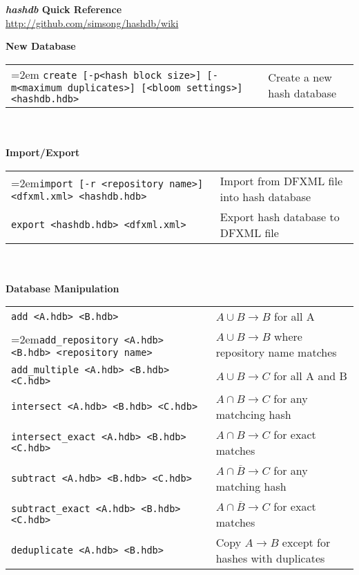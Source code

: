 \documentclass[12pt]{article}
\newcommand{\hdb}{\emph{hashdb}\xspace}
\begin{document}
\begin{center}
\textbf{\Large \hdb Quick Reference} \\
\url{http://github.com/simsong/hashdb/wiki}
\end{center}

\textbf{New Database} \\
\begin{tabular}{p{3.6 in} p{4 in}}
\hangindent=2em \small\texttt{create [-p<hash block size>] [-m<maximum duplicates>] [<bloom settings>] <hashdb.hdb>} &
Create a new hash database \\
\end{tabular}
\\
\\
\textbf{Import/Export} \\
\begin{tabular}{p{3.6 in} p{4 in}}
\hangindent=2em\small\texttt{import [-r <repository name>] <dfxml.xml> <hashdb.hdb>} &
Import from DFXML file into hash database \\
\small\texttt{export <hashdb.hdb> <dfxml.xml>} &
Export hash database to DFXML file \\
\end{tabular}
\\
\\
\textbf{Database Manipulation} \\
\begin{tabular}{p{3.6 in} p{4 in}}
\small\texttt{add <A.hdb> <B.hdb>} & $A \cup B \rightarrow B$ for all A \\
\hangindent=2em\small\texttt{add\_repository <A.hdb> <B.hdb> <repository name>} & $A \cup B \rightarrow B$ where repository name matches \\
\small\texttt{add\_multiple <A.hdb> <B.hdb> <C.hdb>} & $A \cup B \rightarrow C$ for all A and B \\
\small\texttt{intersect <A.hdb> <B.hdb> <C.hdb>} & $A \cap B \rightarrow C$ for any matchcing hash\\
\small\texttt{intersect\_exact <A.hdb> <B.hdb> <C.hdb>} & $A \cap B \rightarrow C$ for exact matches\\
\small\texttt{subtract <A.hdb> <B.hdb> <C.hdb>} & $A \cap \overline B \rightarrow C$ for any matching hash \\
\small\texttt{subtract\_exact <A.hdb> <B.hdb> <C.hdb>} & $A \cap \overline B \rightarrow C$ for exact matches \\
\small\texttt{deduplicate <A.hdb> <B.hdb>} & Copy $A \rightarrow B$ except for hashes with duplicates \\
\end{tabular}
\end{document}

